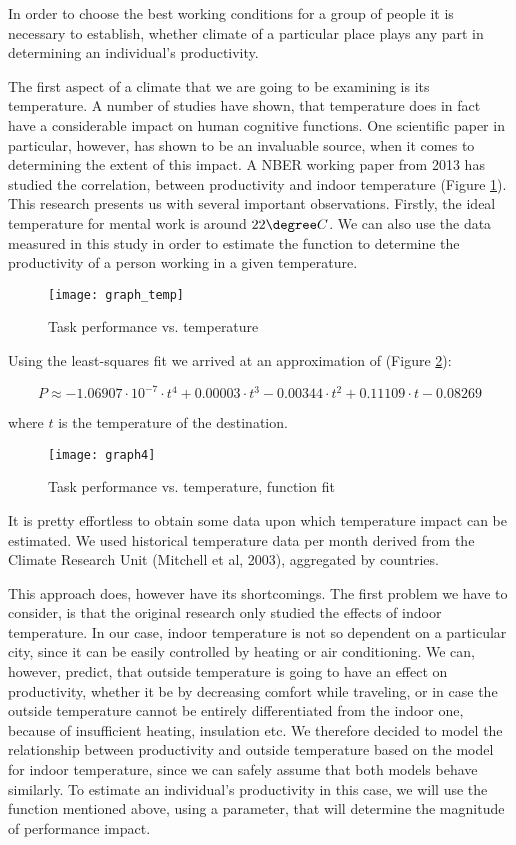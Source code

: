 
In order to choose the best working conditions for a group of people it is necessary to establish, whether climate of a particular place plays any part in determining an individual's productivity.

The first aspect of a climate that we are going to be examining is its temperature. A number of studies \cite{Taylor2015,Muller2012} have shown, that temperature does in fact have a considerable impact on human cognitive functions. One scientific paper in particular, however, has shown to be an invaluable source, when it comes to determining the extent of this impact. A NBER working paper from 2013 \cite{Chetty2013} has studied the correlation, between productivity and indoor temperature (Figure \ref{temp:research}). This research presents us with several important observations. Firstly, the ideal temperature for mental work is around $22\degree C$. We can also use the data measured in this study in order to estimate the function to determine the productivity of a person working in a given temperature.

\begin{figure}[ht]
	\centering
    	\texttt{[image: graph\_temp]}
    \caption{Task performance vs. temperature \cite{Chetty2013}}
    \label{temp:research}
\end{figure}

Using the least-squares fit we arrived at an approximation of (Figure \ref{temp:approximation}):

$$P\approx -1.06907 \cdot 10^{-7} \cdot t^{4}+0.00003 \cdot t^{3}-0.00344 \cdot t^{2}+0.11109 \cdot t-0.08269$$

\noindent where $t$ is the temperature of the destination.

\begin{figure}[ht]
	\centering
    	\texttt{[image: graph4]}
    \caption{Task performance vs. temperature, function fit}
    \label{temp:approximation}
\end{figure}

It is pretty effortless to obtain some data upon which temperature impact can be estimated. We used historical temperature data per month derived from the Climate Research Unit (Mitchell et al, 2003), aggregated by countries.

This approach does, however have its shortcomings. The first problem we have to consider, is that the original research only studied the effects of indoor temperature. In our case, indoor temperature is not so dependent on a particular city, since it can be easily controlled by heating or air conditioning. We can, however, predict, that outside temperature is going to have an effect on productivity, whether it be by decreasing comfort while traveling, or in case the outside temperature cannot be entirely differentiated from the indoor one, because of insufficient heating, insulation etc. We therefore decided to model the relationship between productivity and outside temperature based on the model for indoor temperature, since we can safely assume that both models behave similarly. To estimate an individual's productivity in this case, we will use the function mentioned above, using a parameter, that will determine the magnitude of performance impact.


